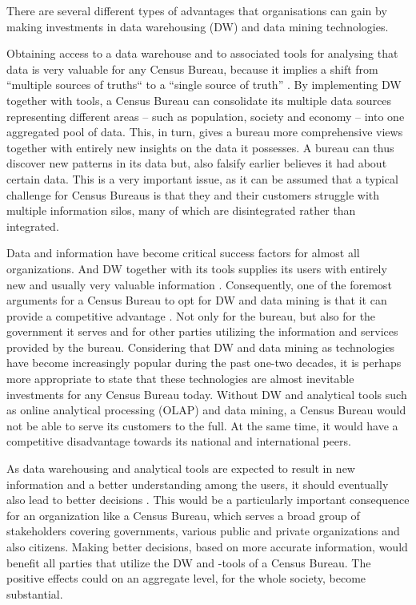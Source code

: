 There are several different types of advantages that organisations can gain by making investments in data warehousing (DW) and data mining technologies.

Obtaining access to a data warehouse and to associated tools for analysing that data is very valuable for any Census Bureau, 
because it implies a shift from “multiple sources of truths“ to a “single source of truth” \cite{l2video}. 
By implementing DW together with tools, a Census Bureau can consolidate its multiple data sources representing different areas -- 
such as population, society and economy -- into one aggregated pool of data. 
This, in turn, gives a bureau more comprehensive views together with entirely new insights on the data it possesses. 
A bureau can thus discover new patterns in its data but, also falsify earlier believes it had about certain data. 
This is a very important issue, 
as it can be assumed that a typical challenge for Census Bureaus is that they and their customers struggle with multiple information silos, 
many of which are disintegrated rather than integrated.

Data and information have become critical success factors for almost all organizations. 
And DW together with its tools supplies its users with entirely new and usually very valuable information \cite[chapter~31.1.3]{CourseLitt}. 
Consequently, one of the foremost arguments for a Census Bureau to opt for DW and data mining is that it can provide a competitive advantage \cite{l2video}. 
Not only for the bureau, but also for the government it serves and for other parties utilizing the information and services provided by the bureau. 
Considering that DW and data mining as technologies have become increasingly popular during the past one-two decades, 
it is perhaps more appropriate to state that these technologies are almost inevitable investments for any Census Bureau today. 
Without DW and analytical tools such as online analytical processing (OLAP) and data mining, 
a Census Bureau would not be able to serve its customers to the full. 
At the same time, it would have a competitive disadvantage towards its national and international peers.

As data warehousing and analytical tools are expected to result in new information and a better understanding among the users,
it should eventually also lead to better decisions \cite[chapter~31.1.3]{CourseLitt}. 
This would be a particularly important consequence for an organization like a Census Bureau, 
which serves a broad group of stakeholders covering governments, 
various public and private organizations and also citizens. 
Making better decisions, based on more accurate information, would benefit all parties that utilize the DW and -tools of a Census Bureau. 
The positive effects could on an aggregate level, for the whole society, become substantial.

